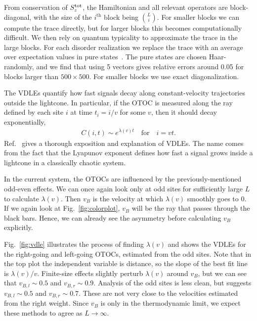 \documentclass[aps,prx,reprint,superscriptaddress, longbibliography]{revtex4-1}
\newcommand{\charlie}[1]{{\color{Magenta}{{#1}}}}
\newcommand{\Sz}{S_z^{\rm tot}}
\begin{document}
\charlie{Move this paragraph to an appendix?}
From conservation of $\Sz$, the Hamiltonian and all relevant operators are block-diagonal, with the size of the $i^\text{th}$ block being $\binom{L}{i}$. For smaller blocks we can compute the trace directly, but for larger blocks this becomes computationally difficult. We then rely on quantum typicality to approximate the trace in the large blocks. For each disorder realization we replace the trace with an average over expectation values in pure states~\cite{Luitz2017}. The pure states are chosen Haar-randomly, and we find that using 5 vectors gives relative errors around 0.05 for blocks larger than $500\times 500$. For smaller blocks we use exact diagonalization.

The VDLEs quantify how fast signals decay along constant-velocity trajectories outside the lightcone. In particular, if the OTOC is measured along the ray defined by each site $i$ at time $t_i = i/v$ for some $v$, then it should decay exponentially,
\begin{align}
C(i, t) \sim e^{\lambda(v)t}\quad\text{for}\quad i = vt.
\end{align}
Ref.~\cite{Khemani2018lambda} gives a thorough exposition and explanation of VDLEs. The name comes from the fact that the Lyapunov exponent defines how fast a signal grows inside a lightcone in a classically chaotic system. 

In the current system, the OTOCs are influenced by the previously-mentioned odd-even effects. We can once again look only at odd sites for sufficiently large $L$ to calculate $\lambda(v)$. Then $v_B$ is the velocity at which $\lambda(v)$ smoothly goes to 0. If we again look at Fig.~\ref{fig:colorplot}, $v_B$ will be the ray that passes through the black bars. Hence, we can already see the asymmetry before calculating $v_B$ explicitly. 

Fig.~\ref{fig:vdle} illustrates the process of finding $\lambda(v)$ and shows the VDLEs for the right-going and left-going OTOCs, estimated from the odd sites. Note that in the top plot the independent variable is distance, so the slope of the best fit line is $\lambda(v)/v$.
Finite-size effects slightly perturb $\lambda(v)$ around $v_B$, but we can see that $v_{B,l} \sim 0.5$ and $v_{B,r} \sim 0.9$. Analysis of the odd sites is less clean, but suggests $v_{B,l} \sim 0.5$ and $v_{B,r} \sim 0.7$.
These are not very close to the velocities estimated from the right weight. Since $v_B$ is \charlie{well defined} only in the thermodynamic limit, we expect these methods to agree as $L\to\infty$.
\end{document}
